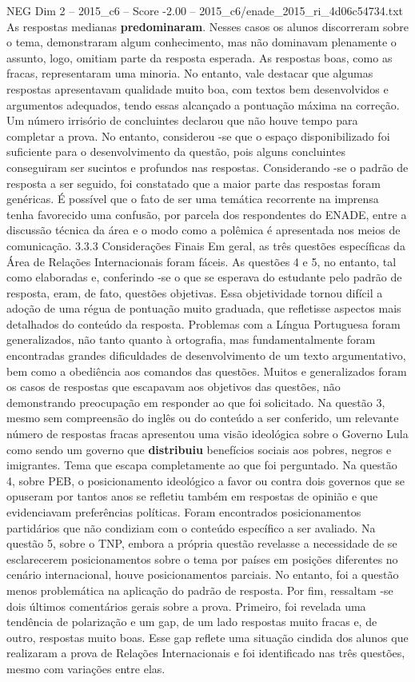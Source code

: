 \begin{textsample}{NEG Dim 2 – 2015\_c6 – Score -2.00 – 2015\_c6/enade\_2015\_ri\_4d06c54734.txt}
As respostas medianas \textbf{predominaram}.
Nesses casos os alunos discorreram sobre o tema, demonstraram algum conhecimento, mas não dominavam plenamente o assunto, logo, omitiam parte da resposta esperada.
As respostas boas, como as fracas, representaram uma minoria.
No entanto, vale destacar que algumas respostas apresentavam qualidade muito boa, com textos bem desenvolvidos e argumentos adequados, tendo essas alcançado a pontuação máxima na correção.
Um número irrisório de concluintes declarou que não houve tempo para completar a prova.
No entanto, considerou -se que o espaço disponibilizado foi suficiente para o desenvolvimento da questão, pois alguns concluintes conseguiram ser sucintos e profundos nas respostas.
Considerando -se o padrão de resposta a ser seguido, foi constatado que a maior parte das respostas foram genéricas.
É possível que o fato de ser uma temática recorrente na imprensa tenha favorecido uma confusão, por parcela dos respondentes do ENADE, entre a discussão técnica da área e o modo como a polêmica é apresentada nos meios de comunicação. 3.3.3 Considerações Finais Em geral, as três questões específicas da Área de Relações Internacionais foram fáceis.
As questões 4 e 5, no entanto, tal como elaboradas e, conferindo -se o que se esperava do estudante pelo padrão de resposta, eram, de fato, questões objetivas.
Essa objetividade tornou difícil a adoção de uma régua de pontuação muito graduada, que refletisse aspectos mais detalhados do conteúdo da resposta.
Problemas com a Língua Portuguesa foram generalizados, não tanto quanto à ortografia, mas fundamentalmente foram encontradas grandes dificuldades de desenvolvimento de um texto argumentativo, bem como a obediência aos comandos das questões.
Muitos e generalizados foram os casos de respostas que escapavam aos objetivos das questões, não demonstrando preocupação em responder ao que foi solicitado.
Na questão 3, mesmo sem compreensão do inglês ou do conteúdo a ser conferido, um relevante número de respostas fracas apresentou uma visão ideológica sobre o Governo Lula como sendo um governo que \textbf{distribuiu} benefícios sociais aos pobres, negros e imigrantes.
Tema que escapa completamente ao que foi perguntado.
Na questão 4, sobre PEB, o posicionamento ideológico a favor ou contra dois governos que se opuseram por tantos anos se refletiu também em respostas de opinião e que evidenciavam preferências políticas.
Foram encontrados posicionamentos partidários que não condiziam com o conteúdo específico a ser avaliado.
Na questão 5, sobre o TNP, embora a própria questão revelasse a necessidade de se esclarecerem posicionamentos sobre o tema por países em posições diferentes no cenário internacional, houve posicionamentos parciais.
No entanto, foi a questão menos problemática na aplicação do padrão de resposta.
Por fim, ressaltam -se dois últimos comentários gerais sobre a prova.
Primeiro, foi revelada uma tendência de polarização e um gap, de um lado respostas muito fracas e, de outro, respostas muito boas.
Esse gap reflete uma situação cindida dos alunos que realizaram a prova de Relações Internacionais e foi identificado nas três questões, mesmo com variações entre elas.

\end{textsample}
